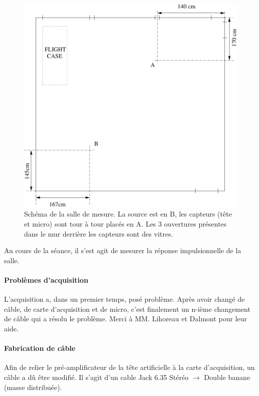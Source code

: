 \documentclass[12pt]{article}
\begin{document}
\begin{figure}[h]
    \vfill\begin{center}
        \includegraphics[scale=0.75]{schema_salle.pdf}
    \end{center}\vfill
    \caption{\label{salle} Schéma de la salle de mesure. La source est en B, les capteurs (tête et micro) sont tour à
tour placés en A. Les 3 ouvertures présentes dans le mur derrière les capteurs sont des vitres.}
\end{figure}

Au cours de la séance, il s'est agit de mesurer la réponse impulsionnelle de la salle.

\paragraph{Problèmes d'acquisition}
L'acquisition a, dans un premier temps, posé problème.
Après avoir changé de câble, de carte d'acquisition et de micro, c'est finalement un n-ième changement de câble qui a
résolu le problème. Merci à MM. Lihoreau et Dalmont pour leur aide.

\paragraph{Fabrication de câble}
Afin de relier le pré-amplificateur de la tête artificielle à la carte d'acquisition, un câble a dû être modifié.
Il s'agit d'un cable Jack 6.35 Stéréo $\rightarrow$ Double banane (masse distribuée).
\end{document}
